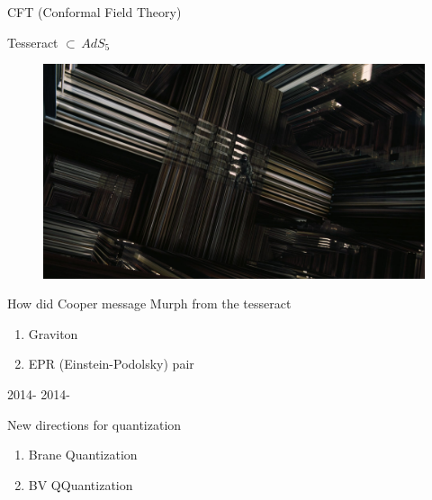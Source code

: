 \documentclass{beamer}
\begin{document}
\begin{frame}{CFT (Conformal Field Theory)}

\end{frame}

\begin{frame}{Tesseract $\subset \, AdS_5$}
		\begin{figure}
			\includegraphics[width=\textwidth]{images/1201172.jpg}
		\end{figure}
\end{frame}

\begin{frame}{How did Cooper message Murph from the tesseract}

\begin{enumerate}
\item Graviton
\item EPR (Einstein-Podolsky) pair
\end{enumerate}
\end{frame}

\begin{frame}{2014-}
2014-
\end{frame}

\begin{frame}{New directions for quantization}
\begin{enumerate}
\item Brane Quantization
\item BV QQuantization
\end{enumerate}
\end{frame}
\end{document}
